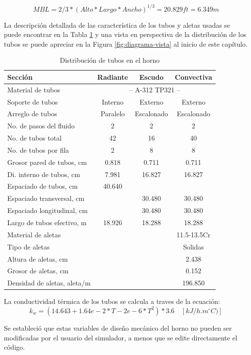 \begin{equation} \label{eq:mbl}
    MBL = 2/3 * (Alto*Largo*Ancho)^{1/3} = 20.829ft = 6.349m
\end{equation}
\par La descripción detallada de las característica de los tubos y aletas usadas se puede encontrar en la Tabla \ref{tbl:tubes} y una vista en perspectiva de la distribución de los tubos se puede apreciar en la Figura \ref{fig:diagrama-vista} al inicio de este capítulo.
\begin{table}[hbt]
\begin{center}
\caption[Distribución de tubos en el horno]{Distribución de tubos en el horno}
\label{tbl:tubes}
\begin{tabular}{l|c|c|c}
Sección 					& Radiante	& Escudo		& Convectiva \\
\hline
Material de tubos			& \multicolumn{3}{c}{-- A-312 TP321 --} \\

Soporte de tubos    		& Interno	& Externo		& Externo		\\
Arreglo	de tubos    		& Paralelo	& Escalonado	& Escalonado	\\
No. de pasos del fluido		& 2	        & 2	            & 2	            \\
No. de tubos total    		& 42		& 16			& 40			\\
No. de tubos por fila		& 2			& 8				& 8				\\
Grosor pared de tubos, cm	& 0.818		& 0.711			& 0.711			\\
Di. interno de tubos, cm	& 7.981		& 16.827		& 16.827		\\
Espaciado de tubos, cm  	& 40.640	& 				& 				\\
Espaciado transversal, cm  	&			& 30.480		& 30.480		\\
Espaciado longitudinal, cm 	&			& 30.480		& 30.480		\\
Largo de tubos efectivo, m	& 18.926    & 18.288		& 18.288		\\
\hline
Material de aletas			&			& 				& 11.5-13.5Cr	\\
Tipo de aletas				&			& 				& Solidas		\\	
Altura de aletas, cm		&			& 				& 2.438			\\
Grosor de aletas, cm		&			& 				& 0.152			\\
Densidad de aletas, aleta/m	&			& 				& 196.850		\\
\end{tabular} \end{center} \end{table}
\par La conductividad térmica de los tubos se calcula a traves de la ecuación:
\begin{equation}
k_w = (14.643 + 1.64e-2*T - 2e-6*T^2)*3.6 \quad [kJ/h.m^{\circ} C)]
\end{equation}
\par Se estableció que estas variables de diseño mecánico del horno no pueden ser modificadas por el usuario del simulador, a menos que se edite directamente el código.

